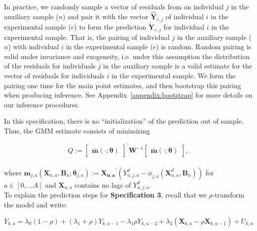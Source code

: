 \begin{enumerate}
\noindent In practice, we randomly sample a vector of residuals from an individual $j$ in the auxiliary sample ($n$) and pair it with the vector $\hat{\bm{Y}}_{e,j}$ of individual $i$ in the experimental sample ($e$) to form the prediction $\tilde{\bm{Y}}_{e,j}$ for individual $i$ in the experimental sample. That is, the pairing of individual $j$ in the auxiliary sample ($n$) with individual $i$ in the experimental sample ($e$) is random. Random pairing is valid under invariance and exogeneity, i.e. under this assumption the distribution of the residuals for individuals $j$ in the auxiliary sample is a valid estimate for the vector of residuals for individuals $i$ in the experimental sample. We form the pairing one time for the main point estimates, and then bootstrap this pairing when producing inference. See Appendix~\ref{appendix:bootstrap} for more details on our inference procedures.
\end{enumerate}

\noindent In this specification, there is no ``initialization'' of the prediction out of sample. Thus, the GMM estimate consists of minimizing

\begin{equation}
Q :=  {\begin{bmatrix} {\bm{\bar{m}} \left( \cdot ; \bm{\theta} \right) }  \end{bmatrix}}^{'}
\bm{W} ^{-1}{\begin{bmatrix} {\bm{\bar{m}} \left( \cdot ; \bm{\theta} \right) }   \end{bmatrix}}, \label{eq:wlossspec2}
\end{equation}\\

\noindent where $\bm{m}_{j,a} \left( \bm{X}_{n,a}, \bm{B}_{n} ; \bm{\theta}_{j,a} \right) := {\bm{X_{n,a}}}^{'} \left( Y_{n,j,a}^d -   \phi_{j,a} \left( \bm{X}_{n,a}^d, \bm{B}_{n} \right) \right)$ for $a \in [0, \ldots A]$ and  $\bm{X}_{n,a}$ contains no lags of $Y_{n,j,a}^d$.\\

\noindent  To explain the prediction steps for \textbf{Specification 3}, recall that we $\rho$-transform the model and write:

\begin{equation}
Y_{k,a} = \lambda_{0} \left( 1 - \rho \right) + \left( \lambda_{1} + \rho \right) Y_{k,a-1} - \lambda_{1} \rho Y_{k,a-2} + \lambda_{2} \left( \bm{X}_{k,a} - \rho \bm{X}_{k,a-1}  \right) + U_{k,a} \label{eq:rhotransform}
\end{equation}

